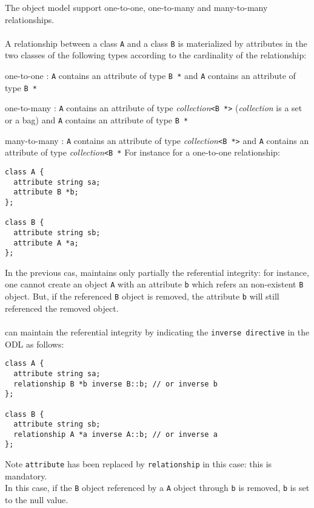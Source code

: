 The \eyedb object model support one-to-one, one-to-many and many-to-many
relationships. 
\\
\\
A relationship between a class \texttt{A} and a class \texttt{B} is
materialized by attributes in the two classes of the following
types according to the cardinality of the relationship:
\bi
\item one-to-one : \texttt{A} contains an attribute of type \texttt{B *} and
\texttt{A} contains an attribute  of type \texttt{B *}
\item one-to-many : \texttt{A} contains an attribute of type \emph{collection}\texttt{<B *>} (\emph{collection} is a set or a bag) and
\texttt{A} contains an attribute  of type \texttt{B *}
\item many-to-many : \texttt{A} contains an attribute of type \emph{collection}\texttt{<B *>} and
\texttt{A} contains an attribute  of type \emph{collection}\texttt{<B *}
\ei
For instance for a one-to-one relationship:
\vspace{-0.2cm}
\begin{verbatim}
class A {
  attribute string sa;
  attribute B *b;
};

class B {
  attribute string sb;
  attribute A *a;
};
\end{verbatim}
In the previous cas, \eyedb maintains only partially the referential
integrity: for instance, one cannot create an object \texttt{A}
with an attribute \texttt{b} which refers an non-existent \texttt{B}
object. But, if the referenced \texttt{B} object is removed, the attribute
\texttt{b} will still referenced the removed object.
\\
\\
\eyedb can maintain the referential integrity by indicating the
\texttt{inverse directive} in the ODL as follows:
\vspace{-0.2cm}
\begin{verbatim}
class A {
  attribute string sa;
  relationship B *b inverse B::b; // or inverse b
};

class B {
  attribute string sb;
  relationship A *a inverse A::b; // or inverse a
};
\end{verbatim}
Note \texttt{attribute} has been replaced by \texttt{relationship} in
this case: this is mandatory.
\\
In this case, if the \texttt{B} object referenced by a \texttt{A} object
through \texttt{b} is removed, \texttt{b} is set to the null value.
\\
